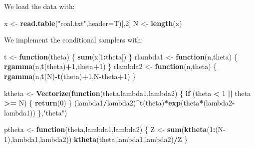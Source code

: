 \documentclass[
  11pt,
]{article}
\newenvironment{Shaded}{\begin{snugshade}}{\end{snugshade}}
\newcommand{\AttributeTok}[1]{\textcolor[rgb]{0.13,0.29,0.53}{#1}}
\newcommand{\ControlFlowTok}[1]{\textcolor[rgb]{0.13,0.29,0.53}{\textbf{#1}}}
\newcommand{\DecValTok}[1]{\textcolor[rgb]{0.00,0.00,0.81}{#1}}
\newcommand{\FunctionTok}[1]{\textcolor[rgb]{0.13,0.29,0.53}{\textbf{#1}}}
\newcommand{\NormalTok}[1]{#1}
\newcommand{\OtherTok}[1]{\textcolor[rgb]{0.56,0.35,0.01}{#1}}
\newcommand{\SpecialCharTok}[1]{\textcolor[rgb]{0.81,0.36,0.00}{\textbf{#1}}}
\newcommand{\StringTok}[1]{\textcolor[rgb]{0.31,0.60,0.02}{#1}}
\begin{document}
We load the data with:

\begin{Shaded}
\begin{Highlighting}[]
\NormalTok{x }\OtherTok{\textless{}{-}} \FunctionTok{read.table}\NormalTok{(}\StringTok{"coal.txt"}\NormalTok{,}\AttributeTok{header=}\NormalTok{T)[,}\DecValTok{2}\NormalTok{]}
\NormalTok{N }\OtherTok{\textless{}{-}} \FunctionTok{length}\NormalTok{(x)}
\end{Highlighting}
\end{Shaded}

We implement the conditional samplers with:

\begin{Shaded}
\begin{Highlighting}[]
\NormalTok{t }\OtherTok{\textless{}{-}} \ControlFlowTok{function}\NormalTok{(theta) \{ }\FunctionTok{sum}\NormalTok{(x[}\DecValTok{1}\SpecialCharTok{:}\NormalTok{theta]) \}}
\NormalTok{rlambda1 }\OtherTok{\textless{}{-}} \ControlFlowTok{function}\NormalTok{(n,theta) \{ }\FunctionTok{rgamma}\NormalTok{(n,}\FunctionTok{t}\NormalTok{(theta)}\SpecialCharTok{+}\DecValTok{1}\NormalTok{,theta}\SpecialCharTok{+}\DecValTok{1}\NormalTok{) \}}
\NormalTok{rlambda2 }\OtherTok{\textless{}{-}} \ControlFlowTok{function}\NormalTok{(n,theta) \{ }\FunctionTok{rgamma}\NormalTok{(n,}\FunctionTok{t}\NormalTok{(N)}\SpecialCharTok{{-}}\FunctionTok{t}\NormalTok{(theta)}\SpecialCharTok{+}\DecValTok{1}\NormalTok{,N}\SpecialCharTok{{-}}\NormalTok{theta}\SpecialCharTok{+}\DecValTok{1}\NormalTok{) \}}

\NormalTok{ktheta }\OtherTok{\textless{}{-}} \FunctionTok{Vectorize}\NormalTok{(}\ControlFlowTok{function}\NormalTok{(theta,lambda1,lambda2)}
\NormalTok{\{}
  \ControlFlowTok{if}\NormalTok{ (theta }\SpecialCharTok{\textless{}} \DecValTok{1} \SpecialCharTok{||}\NormalTok{ theta }\SpecialCharTok{\textgreater{}=}\NormalTok{ N) \{ }\FunctionTok{return}\NormalTok{(}\DecValTok{0}\NormalTok{) \}  }
\NormalTok{  (lambda1}\SpecialCharTok{/}\NormalTok{lambda2)}\SpecialCharTok{\^{}}\FunctionTok{t}\NormalTok{(theta)}\SpecialCharTok{*}\FunctionTok{exp}\NormalTok{(theta}\SpecialCharTok{*}\NormalTok{(lambda2}\SpecialCharTok{{-}}\NormalTok{lambda1))}
\NormalTok{\},}\StringTok{"theta"}\NormalTok{)}

\NormalTok{ptheta }\OtherTok{\textless{}{-}} \ControlFlowTok{function}\NormalTok{(theta,lambda1,lambda2)}
\NormalTok{\{}
\NormalTok{  Z }\OtherTok{\textless{}{-}} \FunctionTok{sum}\NormalTok{(}\FunctionTok{ktheta}\NormalTok{(}\DecValTok{1}\SpecialCharTok{:}\NormalTok{(N}\DecValTok{{-}1}\NormalTok{),lambda1,lambda2))}
  \FunctionTok{ktheta}\NormalTok{(theta,lambda1,lambda2)}\SpecialCharTok{/}\NormalTok{Z}
\NormalTok{\}}


\end{Highlighting}
\end{Shaded}
\end{document}
